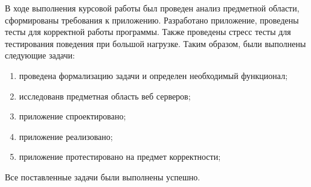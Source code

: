 В ходе выполнения курсовой работы был проведен анализ предметной
области, сформированы требования к приложению. Разработано приложение,
проведены тесты для корректной работы программы. Также проведены стресс
тесты для тестирования поведения при большой нагрузке.
Таким образом, были выполнены следующие задачи:

\begin{enumerate}
  \item проведена формализацию задачи и определен необходимый функционал;
  \item исследованв предметная область веб серверов;
  \item приложение спроектировано;
  \item приложение реализовано;
  \item приложение протестировано на предмет корректности;
\end{enumerate}

Все поставленные задачи были выполнены успешно.

